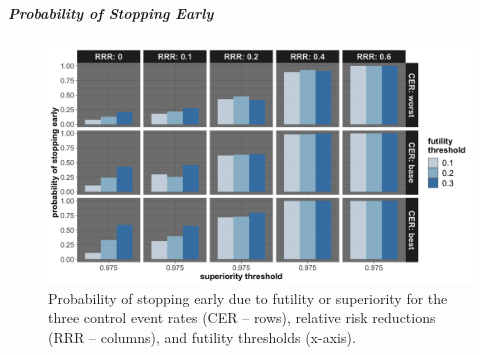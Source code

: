 \documentclass[]{article}
\let\oldsubparagraph\subparagraph
\renewcommand{\subparagraph}[1]{\oldsubparagraph{#1}\mbox{}}
\begin{document}
\clearpage

\hypertarget{probability-of-stopping-early-1}{%
\subparagraph{Probability of Stopping
Early}\label{probability-of-stopping-early-1}}

\begin{figure}
  \caption{Probability of stopping early due to futility or superiority for the three control event rates (CER – rows), relative risk reductions (RRR – columns), and futility thresholds (x-axis).}
  \includegraphics{../p1_plots/batch_size_nb_2000/prob_stop_early_p1.png}
\end{figure}
\end{document}
